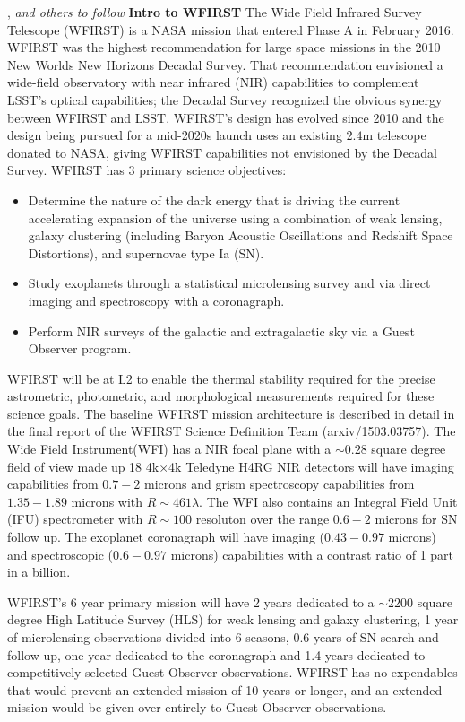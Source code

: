 ,
{\it and others to follow}
\textbf{Intro to WFIRST} 
The Wide Field Infrared Survey Telescope (WFIRST) is a NASA mission that entered Phase A in February 2016.  WFIRST was the highest recommendation for large space missions in the 2010 New Worlds New Horizons Decadal Survey.  That recommendation envisioned a wide-field observatory with near infrared (NIR) capabilities to complement LSST's optical capabilities; the Decadal Survey recognized the obvious synergy between WFIRST and LSST.  WFIRST's design has evolved since 2010 and the design being pursued for a mid-2020s launch uses an existing $2.4$m telescope donated to NASA, giving WFIRST capabilities not envisioned by the Decadal Survey.  WFIRST has 3 primary science objectives:
\begin{itemize}
\item Determine the nature of the dark energy that is driving the current accelerating expansion of the universe using a combination of weak lensing, galaxy clustering (including Baryon Acoustic Oscillations and Redshift Space Distortions), and supernovae type Ia (SN).
\item Study exoplanets through a statistical microlensing survey and via direct imaging and spectroscopy with a coronagraph. 
\item Perform NIR surveys of the galactic and extragalactic sky via a Guest Observer program. 
\end{itemize}
WFIRST will be at L2 to enable the thermal stability required for the precise astrometric, photometric, and morphological measurements required for these science goals. The baseline WFIRST mission architecture is described in detail in the final report of the WFIRST Science Definition Team (arxiv/1503.03757). The Wide Field Instrument(WFI) has a NIR focal plane with a $\sim0.28$ square degree field of view made up 18 4k$\times$4k Teledyne H4RG NIR detectors will have imaging capabilities from $0.7-2$ microns and grism spectroscopy capabilities from $1.35-1.89$ microns with $R\sim461\lambda$.  The WFI also contains an Integral Field Unit (IFU) spectrometer with $R\sim100$ resoluton over the range $0.6-2$ microns for SN follow up. The exoplanet coronagraph will have imaging ($0.43-0.97$ microns) and spectroscopic ($0.6-0.97 $ microns) capabilities with a contrast ratio of 1 part in a billion.

WFIRST's  6 year primary mission will have 2 years dedicated to a $\sim2200$ square degree High Latitude Survey (HLS) for weak lensing and galaxy clustering,  1 year of microlensing observations divided into 6 seasons, $0.6$ years of SN search and follow-up, one year dedicated to the coronagraph and 1.4 years dedicated to competitively selected Guest Observer observations. WFIRST has no expendables that would prevent an extended mission of 10 years or longer, and an extended mission would be given over entirely to Guest Observer observations. 

